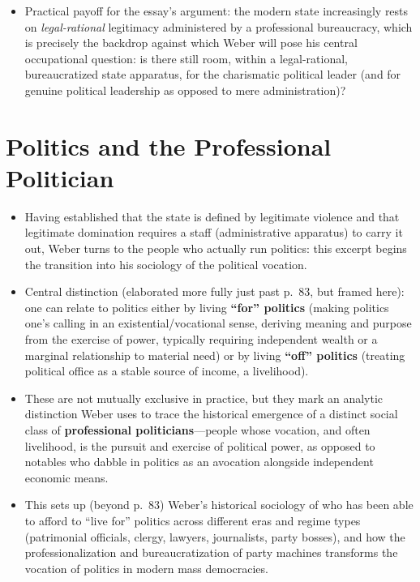 \documentclass[12pt]{article}
\begin{document}
\begin{itemize}[leftmargin=*, itemsep=4pt]
    \item Practical payoff for the essay's argument: the modern state increasingly rests on \emph{legal-rational} legitimacy administered by a professional bureaucracy, which is precisely the backdrop against which Weber will pose his central occupational question: is there still room, within a legal-rational, bureaucratized state apparatus, for the charismatic political leader (and for genuine political leadership as opposed to mere administration)?
\end{itemize}

\section{Politics and the Professional Politician}

\begin{itemize}[leftmargin=*, itemsep=4pt]
    \item Having established that the state is defined by legitimate violence and that legitimate domination requires a staff (administrative apparatus) to carry it out, Weber turns to the people who actually run politics: this excerpt begins the transition into his sociology of the political vocation.
    \item Central distinction (elaborated more fully just past p.\ 83, but framed here): one can relate to politics either by living \textbf{``for'' politics} (making politics one's calling in an existential/vocational sense, deriving meaning and purpose from the exercise of power, typically requiring independent wealth or a marginal relationship to material need) or by living \textbf{``off'' politics} (treating political office as a stable source of income, a livelihood).
    \item These are not mutually exclusive in practice, but they mark an analytic distinction Weber uses to trace the historical emergence of a distinct social class of \textbf{professional politicians}---people whose vocation, and often livelihood, is the pursuit and exercise of political power, as opposed to notables who dabble in politics as an avocation alongside independent economic means.
    \item This sets up (beyond p.\ 83) Weber's historical sociology of who has been able to afford to ``live for'' politics across different eras and regime types (patrimonial officials, clergy, lawyers, journalists, party bosses), and how the professionalization and bureaucratization of party machines transforms the vocation of politics in modern mass democracies.
\end{itemize}
\end{document}
